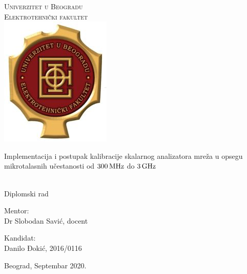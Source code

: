 \documentclass[a4paper, 12pt, diplomski]{etf}
\newcommand{\unit}[1]{\,{\rm #1}}
\begin{document}


\begin{center}
    {
    \Large
    \textsc{Univerzitet u Beogradu} \\
    \textsc{Elektrotehnički fakultet} \\
    \includegraphics[scale=.5]{fig/etf-logo-lat.jpg}
    
    \vfill
    
    \LARGE
    Implementacija i postupak kalibracije skalarnog
    analizatora mreža u opsegu mikrotalasnih učestanosti
    od $300\unit{MHz}$ do $3\unit{GHz}$
    } \\[2mm]
    {\large Diplomski rad}
    
    \vfill
    
    \large 
    
    \begin{minipage}{.49\textwidth}
    Mentor:     \\
    Dr Slobodan Savić, docent
    \end{minipage}
    \begin{minipage}{.49\textwidth}
    \begin{flushright}
    Kandidat: \\
    Danilo Đokić, 2016/0116
    \end{flushright}
    \end{minipage}

    
    \vfill
    
    Beograd, Septembar 2020.
\end{center}

\thispagestyle{empty}

\newpage

\tableofcontents
\end{document}

